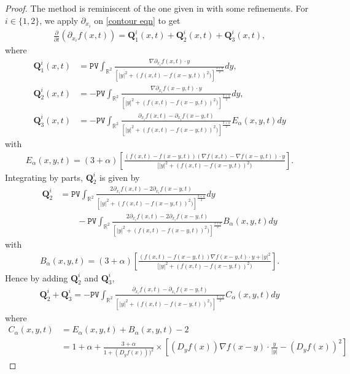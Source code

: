 \documentclass[reqno]{amsart}%
\theoremstyle{definition}
\theoremstyle{remark}
\numberwithin{equation}{section}
\newcommand{\0}{\mathbf{0}}
\newcommand{\1}{\mathbf{1}}
\newcommand{\R}{\mathbb R}
\newcommand{\PV}{\texttt{PV}}
\numberwithin{equation}{section}
\numberwithin{theorem}{section}
\numberwithin{figure}{section}
\begin{document}
\begin{proof}
The method is reminiscent of the one given in \cite{constantin2016muskat} with some refinements. For $i\in\{1,2\}$, we apply $\partial_{x_i}$ on \eqref{contour eqn} to get
\begin{align*}
\frac{\partial}{\partial t}(\partial_{x_i}f(x,t))=\mathbf{Q}^{i}_1(x,t)+\mathbf{Q}^{i}_2(x,t)+\mathbf{Q}^{i}_3(x,t),
\end{align*}
where
\begin{align*}
\mathbf{Q}^{i}_1(x,t)&=\PV\int_{\R^2}\frac{\nabla\partial_{x_i}f(x,t)\cdot y}{[|y|^2+(f(x,t)-f(x-y,t))^2)]^\frac{3+\alpha}{2}}dy,\\
\mathbf{Q}^{i}_2(x,t)&=-\PV\int_{\R^2}\frac{\nabla\partial_{x_i}f(x-y,t)\cdot y}{[|y|^2+(f(x,t)-f(x-y,t))^2)]^\frac{3+\alpha}{2}}dy,\\
\mathbf{Q}^{i}_3(x,t)&=-\PV\int_{\R^2}\frac{\partial_{x_i}f(x,t) - \partial_{x_i}f(x-y,t)}{[|y|^2+(f(x,t)-f(x-y,t))^2)]^\frac{3+\alpha}{2}}E_{\alpha}(x,y,t)dy
\end{align*}
with
\begin{align*}
E_{\alpha}(x,y,t)=(3+\alpha)\left[\frac{(f(x,t)-f(x-y,t))(\nabla f(x,t)-\nabla f(x-y,t))\cdot y}{[|y|^2+(f(x,t)-f(x-y,t))^2)}\right].
\end{align*}
Integrating by parts, $\mathbf{Q}^{i}_2$ is given by
\begin{align*}
\mathbf{Q}^{i}_2&=\PV \int_{\R^2}\frac{2\partial_{x_i}f(x,t) - 2\partial_{x_i}f(x-y,t)}{[|y|^2+(f(x,t)-f(x-y,t))^2)]^\frac{3+\alpha}{2}}dy\\
&\qquad - \PV\int_{\R^2}\frac{2\partial_{x_i}f(x,t) - 2\partial_{x_i}f(x-y,t)}{[|y|^2+(f(x,t)-f(x-y,t))^2)]^\frac{3+\alpha}{2}}B_{\alpha}(x,y,t)dy
\end{align*}
with
\begin{align*}
B_{\alpha}(x,y,t)=(3+\alpha)\left[\frac{(f(x,t)-f(x-y,t))\nabla f(x-y,t)\cdot y + |y|^2}{[|y|^2+(f(x,t)-f(x-y,t))^2)}\right].
\end{align*}
Hence by adding $\mathbf{Q}^{i}_2$ and $\mathbf{Q}^{i}_3$,
\begin{align*}
\mathbf{Q}^{i}_2+\mathbf{Q}^{i}_3=-\PV\int_{\R^2}\frac{\partial_{x_i}f(x,t) - \partial_{x_i}f(x-y,t)}{[|y|^2+(f(x,t)-f(x-y,t))^2)]^\frac{3+\alpha}{2}}C_{\alpha}(x,y,t)dy
\end{align*}
where 
\begin{align*}
C_{\alpha}(x,y,t)&=E_{\alpha}(x,y,t)+B_{\alpha}(x,y,t)-2\\
&=1+\alpha+\frac{3+\alpha}{1+(D_y f(x)))^2}\times\left[(D_y f(x))\nabla f(x-y)\cdot\frac{y}{|y|}-(D_y f(x))^2\right]

\end{align*}
\end{proof}
\end{document}

